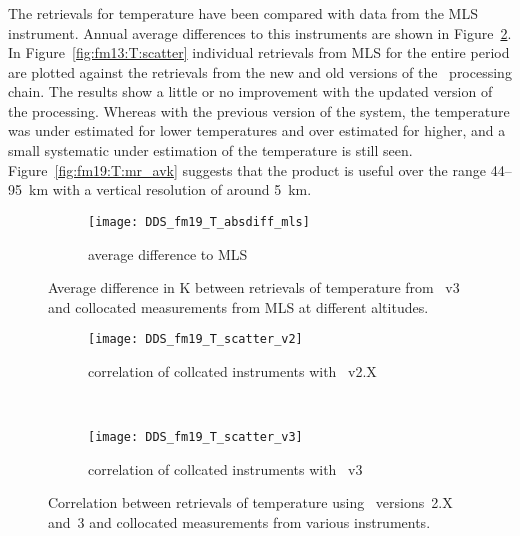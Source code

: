 
\subsubsection{}
\label{sec:fm19:comparison:temperature}
The retrievals for temperature have been compared with data from the MLS
instrument. Annual average differences to this instruments are shown in
Figure~\ref{fig:fm19:T:profiles}. In Figure~\ref{fig:fm13:T:scatter} individual
retrievals from MLS for the entire period are plotted against the retrievals
from the new and old versions of the \smr\ processing chain. The results show a
little or no improvement with the updated version of the processing. Whereas
with the previous version of the system, the temperature was under estimated
for lower temperatures and over estimated for higher, and a small systematic
under estimation of the temperature is still seen.
Figure~\ref{fig:fm19:T:mr_avk} suggests that the product is useful over the
range 44--95~km with a vertical resolution of around 5~km.

\begin{figure}[tbhp]
    \centering
    \begin{subfigure}[b]{0.49\textwidth}
        \texttt{[image: DDS\_fm19\_T\_absdiff\_mls]}
        \caption{average difference to MLS}
        \label{fig:fm19:T:profiles:MLS}
    \end{subfigure}
    \caption{Average difference in K between retrievals of temperature from
    \smr~v3 and collocated measurements from MLS at different altitudes.}
    \label{fig:fm19:T:profiles}
\end{figure}

\begin{figure}[tbhp]
    \centering
    \begin{subfigure}[b]{0.49\textwidth}
        \texttt{[image: DDS\_fm19\_T\_scatter\_v2]}
        \caption{correlation of collcated instruments with \smr~v2.X}
        \label{fig:fm19:T:scatter:v2}
    \end{subfigure}
    \,
    \begin{subfigure}[b]{0.49\textwidth}
        \texttt{[image: DDS\_fm19\_T\_scatter\_v3]}
        \caption{correlation of collcated instruments with \smr~v3}
        \label{fig:fm19:T:scatter:v3}
    \end{subfigure}
    \caption{Correlation between retrievals of temperature using \smr\
    versions~2.X and~3 and collocated measurements from various instruments.}
    \label{fig:fm19:T:scatter}
\end{figure}

